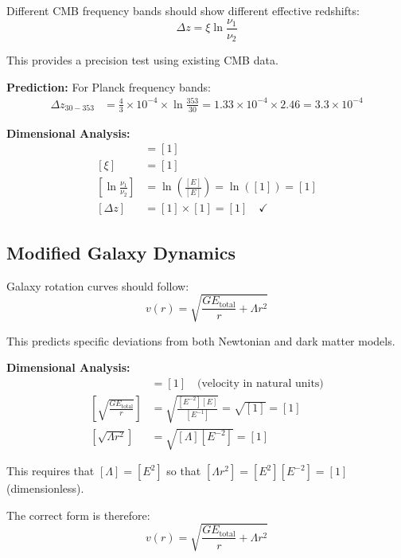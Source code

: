 \documentclass[12pt,a4paper]{report}
\begin{document}
	Different CMB frequency bands should show different effective redshifts:
	\begin{equation}
		\Delta z = \xi \ln\frac{\nu_1}{\nu_2}
	\end{equation}
	
	This provides a precision test using existing CMB data.
	
	\textbf{Prediction:}
	For Planck frequency bands:
	\begin{align}
		\Delta z_{30-353} &= \frac{4}{3} \times 10^{-4} \times \ln\frac{353}{30} = 1.33 \times 10^{-4} \times 2.46 = 3.3 \times 10^{-4}
	\end{align}
	
	\textbf{Dimensional Analysis:}
	\begin{align}
		[\Delta z] &= [1] \\
		[\xi] &= [1] \\
		\left[\ln\frac{\nu_1}{\nu_2}\right] &= \ln\left(\frac{[E]}{[E]}\right) = \ln([1]) = [1] \\
		[\Delta z] &= [1] \times [1] = [1] \quad \checkmark
	\end{align}
	
\subsection{Modified Galaxy Dynamics}
\label{subsec:modified_galaxy_dynamics}

Galaxy rotation curves should follow:
\begin{equation}
	v(r) = \sqrt{\frac{GE_{\text{total}}}{r} + \Lambda r^2}
\end{equation}

This predicts specific deviations from both Newtonian and dark matter models.

\textbf{Dimensional Analysis:}
\begin{align}
	[v(r)] &= [1] \quad \text{(velocity in natural units)} \\
	\left[\sqrt{\frac{GE_{\text{total}}}{r}}\right] &= \sqrt{\frac{[E^{-2}][E]}{[E^{-1}]}} = \sqrt{[1]} = [1] \\
	[\sqrt{\Lambda r^2}] &= \sqrt{[\Lambda][E^{-2}]} = [1]
\end{align}

This requires that $[\Lambda] = [E^2]$ so that $[\Lambda r^2] = [E^2][E^{-2}] = [1]$ (dimensionless).

The correct form is therefore:
\begin{equation}
	v(r) = \sqrt{\frac{GE_{\text{total}}}{r} + \Lambda r^2}
\end{equation}
\end{document}
